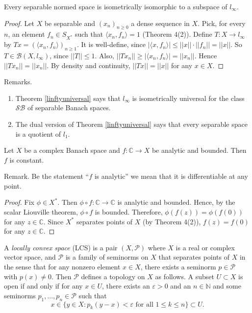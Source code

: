 
\begin{theorem}\label{linftyuniversal}
  Every separable normed space is isometrically isomorphic to a subspace of $l_\infty$.
\end{theorem}

\begin{proof}
  Let $X$ be separable and $(x_n)_{n\geq 0}$ a dense sequence in $X$.
  Pick, for every $n$, an element $f_n\in S_{X^*}$ such that
  $\langle x_n,f_n\rangle =1$ (Theorem 4(2)).
  Define $T:X\to l_\infty$ by $Tx=(\langle x_n,f_n\rangle )_{n\geq 1}$.
  It is well-define, since
  $|\langle x,f_n\rangle|\leq ||x||\cdot||f_n||=||x||$.
  So $T\in \mathcal{B}(X,l_\infty)$, since $||T||\leq 1$.
  Also, $||Tx_n|| \geq |\langle x_n,f_n\rangle |=||x_n||.$
  Hence $||Tx_n||=||x_n||$.
  By density and continuity,
  $||Tx||=||x||$ for any $x\in X$.
\end{proof}

Remarks.

\begin{enumerate}
  \item Theorem \ref{linftyuniversal} says that $l_\infty$ is isometrically universal for the class
  $\mathcal{SB}$ of separable Banach spaces.
  \item The dual version of Theorem \ref{linftyuniversal} says that every separable space is a
  quotient of $l_1$.
\end{enumerate}

\begin{theorem}
Let $X$ be a complex Banach space and $f:\mathbb{C}\to X$ be analytic and bounded.
Then $f$ is constant.
\end{theorem}

Remark. Be the statement ``$f$ is analytic'' we mean that it is differentiable at any point.

\begin{proof}
Fix $\phi\in X^*$. Then $\phi\circ f:\mathbb{C}\to\mathbb{C}$ is analytic and bounded.
Hence, by the scalar Liouville theorem, $\phi\circ f$ is bounded.
Therefore, $\phi(f(z))=\phi(f(0))$ for any $z\in\mathbb{C}$.
Since $X^*$ separates points of $X$ (by Theorem 4(2)),
$f(z)=f(0)$ for any $z\in\mathbb{C}$.
\end{proof}

A \emph{locally convex space}
(LCS) is a pair $(X,\mathcal{P})$ where $X$ is a real or complex vector space,
and $\mathcal{P}$ is a family of seminorms on $X$ that separates points of $X$ in the sense
that for any nonzero element $x\in X$, there exists a seminorm $p\in\mathcal{P}$
with $p(x)\neq 0$.
Then $\mathcal{P}$ defines a topology on $X$ as follows.
A subset $U\subset X$ is open if and only if for any $x\in U$, there exists an $\varepsilon>0$
and an $n\in\mathbb{N}$ and some seminorms $p_1,...,p_n\in\mathcal{P}$
such that
$$x\in\{y\in X:\text{$p_k(y-x)<\varepsilon$ for all $1\leq k\leq n$}\}\subset U.$$

